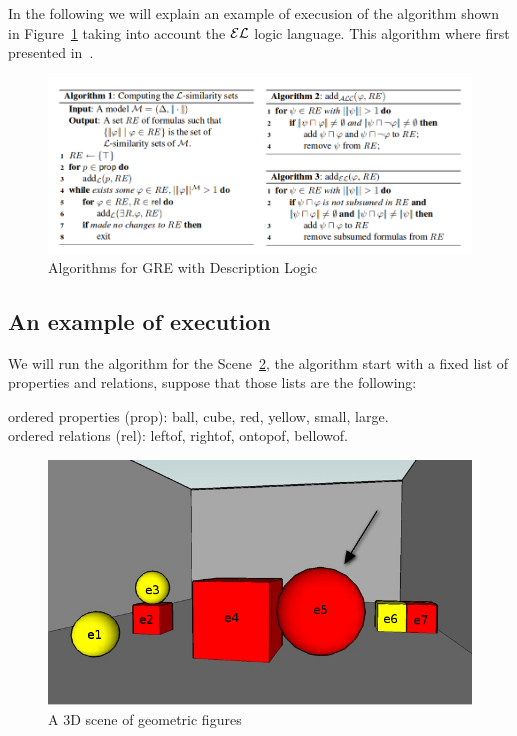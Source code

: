 In the following we will explain an example of execusion of the
algorithm shown in Figure~\ref{algoritmoOriginal} taking into account
the $\mathcal{EL}$ logic language. This algorithm where first presented
in~\cite{arec2:2008:Areces}.

\begin{figure}[h!]
\begin{center}
\includegraphics[width=\textwidth]{images/algoritmoOriginal.png}
\end{center}
\vspace*{-2em}
\caption{Algorithms for GRE with Description Logic}
\label{algoritmoOriginal}
\end{figure}

\subsection{An example of execution}

We will run the algorithm for the Scene~\ref{figure22}, the algorithm
start with a fixed list of properties and relations, suppose that
those lists are the following:

ordered properties (prop): \textsf{ball}, \textsf{cube}, \textsf{red}, \textsf{yellow}, \textsf{small}, \textsf{large}.\\
ordered relations (rel): \textsf{leftof}, \textsf{rightof}, \textsf{ontopof}, \textsf{bellowof}.

\begin{figure}
\begin{center}	
\includegraphics[width=.5\textwidth]{images/22.jpg}
\end{center}
\vspace*{-1.5em}
\caption{A 3D scene of geometric figures}\label{figure22}
\end{figure}

